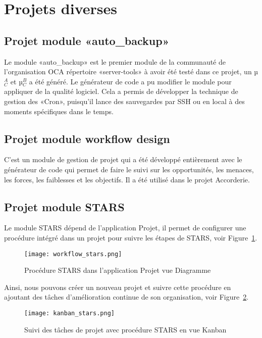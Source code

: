 \section{Projets diverses}

\subsection{Projet module «auto\_backup»}

Le module «auto\_backup» est le premier module de la communauté de l'organisation OCA répertoire «server-tools» à avoir été testé dans ce projet, un µ$_C^A$ et µ$_C^B$ a été généré. Le générateur de code a pu modifier le module pour appliquer de la qualité logiciel. Cela a permis de développer la technique de gestion des «Cron», puisqu’il lance des sauvegardes par SSH ou en local à des moments spécifiques dans le temps.

\subsection{Projet module workflow design}

C’est un module de gestion de projet qui a été développé entièrement avec le générateur de code qui permet de faire le suivi sur les opportunités, les menaces, les forces, les faiblesses et les objectifs. Il a été utilisé dans le projet Accorderie.

\subsection{Projet module STARS}

Le module STARS dépend de l’application Projet, il permet de configurer une procédure intégré dans un projet pour suivre les étapes de STARS, voir Figure~\ref{fig:workflow_stars}.

\begin{figure}
\centering
\texttt{[image: workflow\_stars.png]}
\caption{Procédure STARS dans l'application Projet vue Diagramme}
\label{fig:workflow_stars}
\end{figure}

Ainsi, nous pouvons créer un nouveau projet et suivre cette procédure en ajoutant des tâches d'amélioration continue de son organisation, voir Figure~\ref{fig:kanban_stars}.

\begin{figure}
\centering
\texttt{[image: kanban\_stars.png]}
\caption{Suivi des tâches de projet avec procédure STARS en vue Kanban}
\label{fig:kanban_stars}
\end{figure}

